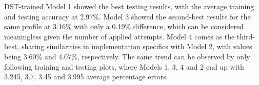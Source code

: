 DST-trained Model 1 showed the best testing results, with the average training and testing accuracy at 2.97\%.
Model 3 showed the second-best results for the same profile at 3.16\% with only a 0.19\% difference, which can be considered meaningless given the number of applied attempts.
Model 4 comes as the third-best, sharing similarities in implementation specifics with Model 2, with values being 3.60\% and 4.07\%, respectively.
The same trend can be observed by only following training and testing plots, where Models 1, 3, 4 and 2 end up with 3.245, 3.7, 3.45 and 3.995 average percentage errors.





%
%

%
%
